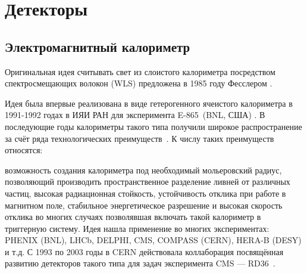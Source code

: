 \section{Детекторы}

\subsection{Электромагнитный калориметр}

Оригинальная идея считывать свет из слоистого калориметра посредством
спектросмещающих волокон (WLS) предложена в 1985 году Фесслером \cite{Fessler-Shashlik-1985}.

Идея была впервые реализована в виде гетерогенного ячеистого калориметра в
1991-1992 годах в ИЯИ РАН для эксперимента E-865~(BNL, США) \cite{BADIER199474}.
В последующие годы калориметры такого типа получили широкое распространение за
счёт ряда технологических преимуществ~\cite{grupenDetectors2008}.
К числу таких преимуществ относятся:

возможность создания калориметра под необходимый мольеровский радиус,
позволяющий производить пространственное
разделение ливней от различных частиц, высокая радиационная
стойкость, устойчивость отклика при работе в магнитном поле,
стабильное энергетическое разрешение и высокая скорость отклика во
многих случаях позволявшая включать такой калориметр в триггерную систему.
Идея нашла применение во многих экспериментах:
PHENIX (BNL), LHCb, DELPHI, CMS, COMPASS (CERN), HERA-B (DESY) и т.д.
С 1993 по 2003 годы в CERN действовала коллаборация посвящённая
развитию детекторов такого типа для задач эксперимента
CMS --- RD36~\cite{rd36-shashlik-1996}.

